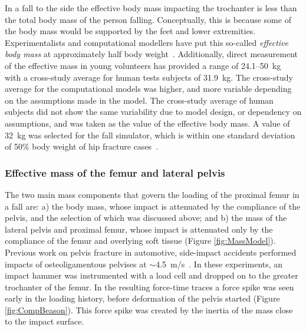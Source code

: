 		In a fall to the side the effective body mass impacting the trochanter is less than the total body mass of the person falling.
		Conceptually, this is because some of the body mass would be supported by the feet and lower extremities.
		Experimentalists and computational modellers have put this so-called \emph{effective body mass} at approximately half body weight~\citep{van_den_kroonenberg_dynamic_1995, robinovitch_prediction_1991}.
		Additionally, direct measurement of the effective mass in young volunteers has provided a range of 24.1--50~\ac{kg}~\citep{robinovitch_prediction_1991, van_den_kroonenberg_dynamic_1995, robinovitch_distribution_1997, laing_force_2008} with a cross-study average for human tests subjects of 31.9~\ac{kg}.
		The cross-study average for the computational models was higher, and more variable depending on the assumptions made in the model.
		The cross-study average of human subjects did not show the same variability due to model design, or dependency on assumptions, and was taken as the value of the effective body mass.
		A value of 32~\ac{kg} was selected for the fall simulator, which is within one standard deviation of 50\% body weight of hip fracture cases~\citep{armstrong_body_2011, orwoll_finite_2009, bouxsein_contribution_2007, nielson_trochanteric_2009}.

		\subsubsection{Effective mass of the femur and lateral pelvis}
		\label{sec:fall_sim_design_methods_apparatus_pelvis}
		The two main mass components that govern the loading of the proximal femur in a fall are: a) the body mass, whose impact is attenuated by the compliance of the pelvis, and the selection of which was discussed above; and b) the mass of the lateral pelvis and proximal femur, whose impact is attenuated only by the compliance of the femur and overlying soft tissue (Figure \ref{fig:MassModel}).
		Previous work on pelvis fracture in automotive, side-impact accidents performed impacts of osteoligamentous pelvises at $\sim$4.5~\ac{m}/\ac{s}~\citep{beason_bone_2003}.
		In these experiments, an impact hammer was instrumented with a load cell and dropped on to the greater trochanter of the femur.
		In the resulting force-time traces a force spike was seen early in the loading history, before deformation of the pelvis started (Figure \ref{fig:CompBeason}).
		This force spike was created by the inertia of the mass close to the impact surface.
		
